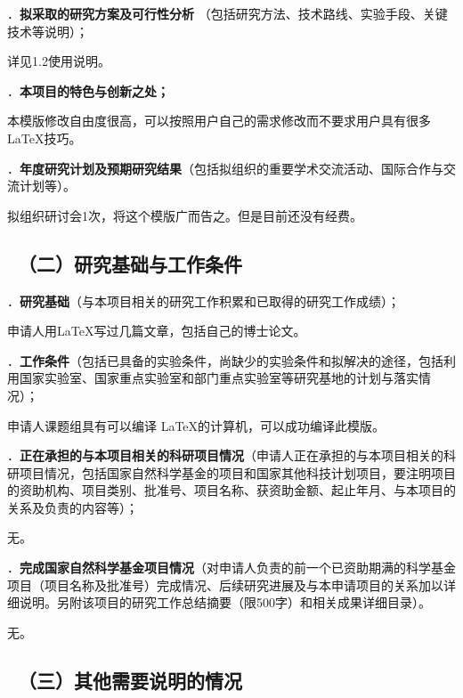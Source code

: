 \documentclass[12pt,UTF8,AutoFakeBold=2,a4paper]{ctexart} %
\newcommand{\sihao}{\fontsize{14pt}{\baselineskip}\selectfont}
\begin{document}
{\sihao \color{MsBlue} ．{\bfseries 拟采取的研究方案及可行性分析} （包括研究方法、技术路线、实验手段、关键技术等说明）；}

详见1.2使用说明。

{\sihao \color{MsBlue} ．{\bfseries 本项目的特色与创新之处；}}

本模版修改自由度很高，可以按照用户自己的需求修改而不要求用户具有很多\LaTeX 技巧。


{\sihao \color{MsBlue} ．{\bfseries 年度研究计划及预期研究结果}（包括拟组织的重要学术交流活动、国际合作与交流计划等）。}

拟组织研讨会1次，将这个模版广而告之。但是目前还没有经费。

\vskip -5mm %

{\color{MsBlue} \subsection{\sihao \kaishu \quad \ （二）研究基础与工作条件 }}

{\sihao \color{MsBlue} ．{\bfseries 研究基础}（与本项目相关的研究工作积累和已取得的研究工作成绩）；}

申请人用\LaTeX 写过几篇文章，包括自己的博士论文。

{\sihao \color{MsBlue} ．{\bfseries 工作条件}（包括已具备的实验条件，尚缺少的实验条件和拟解决的途径，包括利用国家实验室、国家重点实验室和部门重点实验室等研究基地的计划与落实情况）；}

申请人课题组具有可以编译 \LaTeX 的计算机，可以成功编译此模版。

{\sihao \color{MsBlue} ．{\bfseries 正在承担的与本项目相关的科研项目情况}（申请人正在承担的与本项目相关的科研项目情况，包括国家自然科学基金的项目和国家其他科技计划项目，要注明项目的资助机构、项目类别、批准号、项目名称、获资助金额、起止年月、与本项目的关系及负责的内容等）；}

无。

{\sihao \color{MsBlue} ．{\bfseries 完成国家自然科学基金项目情况}（对申请人负责的前一个已资助期满的科学基金项目（项目名称及批准号）完成情况、后续研究进展及与本申请项目的关系加以详细说明。另附该项目的研究工作总结摘要（限500字）和相关成果详细目录）。}

无。

{\color{MsBlue} \subsection{\sihao \kaishu \quad \ （三）其他需要说明的情况 }}
\end{document}
